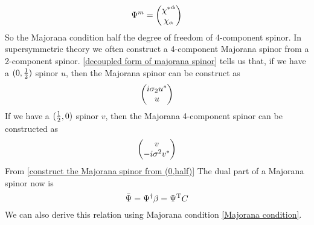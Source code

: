 \begin{equation}\label{decoupled form of majorana spinor}
\Psi^{m} = \mqty(\lc^{\doa} \\ \chi_{\a})
\end{equation}
So the Majorana condition half the degree of freedom of 4-component spinor. 
In supersymmetric theory we often construct a 4-component Majorana spinor from a 2-component spinor. \eqref{decoupled form of majorana spinor} tells us that, if we have a $(0,\frac{1}{2})$ spinor $u$, then the Majorana spinor can be construct as
\begin{equation}\label{construct the Majorana spinor from (0,half)}
\mqty(i\s_{2}u^* \\ u)
\end{equation}
If we have a $(\frac{1}{2},0)$ spinor $v$, then the Majorana 4-component spinor can be constructed as
\begin{equation}
\mqty(v\\-i\s^{2}v^*)
\end{equation}
From \eqref{construct the Majorana spinor from (0,half)}
The dual part of a Majorana spinor now is
\begin{equation}
\bar{\Psi}
=\Psi^{\dagger}\beta
=\Psi^{\text{T}}C 
\end{equation} 
We can also derive this relation using Majorana condition \eqref{Majorana condition}.

